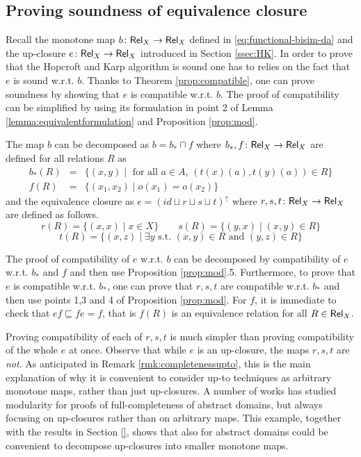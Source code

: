 \documentclass{llncs}
\begin{document}
 
 
 \subsection{Proving soundness of equivalence closure}\label{sec:HKsoundness}
 Recall the monotone map $b\colon \mathsf{Rel}_X \to \mathsf{Rel}_X$ defined in \eqref{eq:functional-bisim-da} and the up-closure $e\colon \mathsf{Rel}_X \to \mathsf{Rel}_X$ introduced in Section \ref{ssec:HK}.
 In order to prove that the Hopcroft and Karp algorithm is sound one has to relies on the fact that $e$ is sound w.r.t. $b$. 
 Thanks to Theorem \ref{prop:compatible}, one can prove soundness by showing that $e$ is compatible w.r.t. $b$. The proof of compatibility can be simplified by using its formulation in point 2 of Lemma \ref{lemma:equivalentformulation} and Proposition \ref{prop:mod}.

The map $b$ can be decomposed as $b = b_* \sqcap f$ where $b_*,f \colon \mathsf{Rel}_X\to  \mathsf{Rel}_X$ are defined for all relations $R$ as
\begin{equation}\label{eq:HKbf}
\begin{array}{rcl}
b_*(R) & =& \{(x,y) \mid \text{ for all } a\in A, \, (t(x)(a), t(y)(a))\in R  \} \\ 
f(R) & = & \{(x_1,x_2)  \mid o(x_1)=o(x_2) \}
\end{array}
\end{equation}
and the equivalence closure as $e= (id\sqcup r \sqcup s \sqcup t )^\uparrow$ where 
$r,s,t\colon \mathsf{Rel}_X \to \mathsf{Rel}_X$ are defined as follows.
$$r(R) = \{(x,x)\mid x\in X \} \qquad s(R)=\{(y,x)\mid (x,y)\in R\}$$ 
$$t(R)=\{(x,z) \mid \exists y \text{ s.t. } (x,y) \in R \text{ and } (y,z)\in R\} $$

The proof of  compatibility of $e$ w.r.t. $b$ can be decomposed by compatibility of $e$ w.r.t. $b_*$ and $f$ and then use Proposition  \ref{prop:mod}.5. Furthermore, to prove that $e$ is compatible w.r.t. $b_*$, one can prove that $r,s,t$ are compatible w.r.t. $b_*$ and then use points 1,3 and 4 of Proposition  \ref{prop:mod}. For $f$, it is immediate to check that $ef\sqsubseteq fe=f$, that is $f(R)$ is an equivalence relation for all $R\in \mathsf{Rel}_X$.

\begin{remark}\label{rmk:mod}
Proving compatibility of each of $r,s,t$ is much simpler than proving compatibility of the whole $e$ at once. Observe that while $e$ is an up-closure, the maps $r,s,t$ are \emph{not}. As anticipated in Remark \ref{rmk:completenessupto}, this is the main explanation of why it is convenient to consider up-to techniques as arbitrary monotone maps, rather than just up-closures. 
%
A number of works  \cite{} has studied modularity for proofs of full-completeness of abstract domains, but always focusing on up-closures rather than on arbitrary maps. This example, together with the results in Section \ref{}, shows that also for abstract domains could be convenient to decompose up-closures into smaller monotone maps.
\end{remark}
\end{document}
